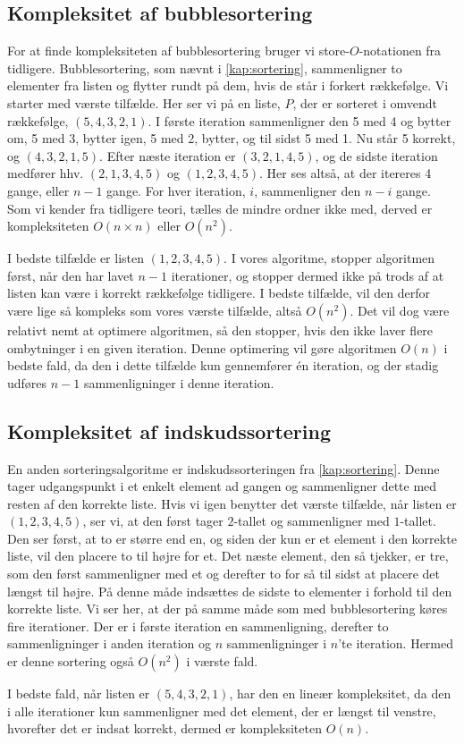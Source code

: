 \subsection{Kompleksitet af bubblesortering} \label{kap:kom_bubble}

For at finde kompleksiteten af bubblesortering bruger vi store-$O$-notationen fra tidligere. 
Bubblesortering, som nævnt i \autoref{kap:sortering}, sammenligner to elementer fra listen og flytter rundt på dem, hvis de står i forkert rækkefølge.
Vi starter med værste tilfælde. Her ser vi på en liste, $P$, der er sorteret i omvendt rækkefølge, $(5,4,3,2,1)$.
I første iteration sammenligner den 5 med 4 og bytter om, 5 med 3, bytter igen, 5 med 2, bytter, og til sidst 5 med 1. Nu står 5 korrekt, og $(4, 3, 2, 1, 5)$.
Efter næste iteration er $(3, 2, 1, 4, 5)$, og de sidste iteration medfører hhv. $(2, 1, 3, 4, 5)$ og $(1, 2, 3, 4, 5)$. Her ses altså, at der itereres 4 gange, eller $n-1$ gange. 
For hver iteration, $i$, sammenligner den $n-i$ gange. 
Som vi kender fra tidligere teori, tælles de mindre ordner ikke med, derved er kompleksiteten $O(n\times n)$ eller $O(n^2)$.

I bedste tilfælde er listen $(1, 2, 3, 4, 5)$.
I vores algoritme, stopper algoritmen først, når den har lavet $n-1$ iterationer, og stopper dermed ikke på trods af at listen kan være i korrekt rækkefølge tidligere. I bedste tilfælde, vil den derfor være lige så kompleks som vores værste tilfælde, altså $O(n^2)$. Det vil dog være relativt nemt at optimere algoritmen, så den stopper, hvis den ikke laver flere ombytninger i en given iteration. Denne optimering vil gøre algoritmen $O(n)$ i bedste fald, da den i dette tilfælde kun gennemfører én iteration, og der stadig udføres $n-1$ sammenligninger i denne iteration. 

\subsection{Kompleksitet af indskudssortering} \label{kap:kom_indskud}
En anden sorteringsalgoritme er indskudssorteringen fra \autoref{kap:sortering}. Denne tager udgangspunkt i et enkelt element ad gangen og sammenligner dette med resten af den korrekte liste.
Hvis vi igen benytter det værste tilfælde, når listen er $(1,2,3,4,5)$, ser vi, at den først tager $2$-tallet og sammenligner med $1$-tallet. Den ser først, at to er større end en, og siden der kun er et element i den korrekte liste, vil den placere to til højre for et. Det næste element, den så tjekker, er tre, som den først sammenligner med et og derefter to for så til sidst at placere det længst til højre. På denne måde indsættes de sidste to elementer i forhold til den korrekte liste.
Vi ser her, at der på samme måde som med bubblesortering køres fire iterationer. Der er i første iteration en sammenligning, derefter to sammenligninger i anden iteration og $n$ sammenligninger i $n$'te iteration. Hermed er denne sortering også $O(n^2)$ i værste fald.


I bedste fald, når listen er $(5,4,3,2,1)$, har den en lineær kompleksitet, da den i alle iterationer kun sammenligner med det element, der er længst til venstre, hvorefter det er indsat korrekt, dermed er kompleksiteten $O(n)$.





